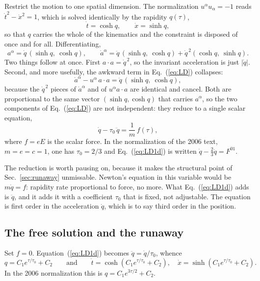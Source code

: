 \documentclass[preprint]{aastex701}
\newcommand{\taunought}{\tau_0}
\begin{document}
Restrict the motion to one spatial dimension. The normalization
$u^\alpha u_\alpha = -1$ reads $\dot t^2 - \dot x^2 = 1$, which is solved
identically by the rapidity $q(\tau)$,
\begin{equation}
\dot t = \cosh q, \qquad \dot x = \sinh q ,
\label{eq:rapidity}
\end{equation}
so that $q$ carries the whole of the kinematics and the constraint is disposed
of once and for all. Differentiating,
\begin{equation}
a^\alpha = \dot q\,(\sinh q,\ \cosh q),
\qquad
\dot a^\alpha = \ddot q\,(\sinh q,\ \cosh q)
             + \dot q^{\,2}(\cosh q,\ \sinh q).
\label{eq:rapidityderivs}
\end{equation}
Two things follow at once. First $a\cdot a = \dot q^{\,2}$, so the invariant
acceleration is just $|\dot q|$. Second, and more usefully, the awkward term in
Eq.~(\ref{eq:LD}) collapses:
\begin{equation}
\dot a^\alpha - u^\alpha\, a\cdot a
= \ddot q\,(\sinh q,\ \cosh q),
\label{eq:reactionreduced}
\end{equation}
because the $\dot q^{\,2}$ pieces of $\dot a^\alpha$ and of
$u^\alpha a\cdot a$ are identical and cancel. Both are proportional to the same
vector $(\sinh q,\cosh q)$ that carries $a^\alpha$, so the two components of
Eq.~(\ref{eq:LD}) are not independent: they reduce to a single scalar equation,
\begin{equation}
\dot q - \taunought\,\ddot q = \frac{1}{m}\,f(\tau),
\label{eq:LD1d}
\end{equation}
where $f = eE$ is the scalar force. In the normalization of the 2006 text,
$m=e=c=1$, one has $\taunought = 2/3$ and Eq.~(\ref{eq:LD1d}) is written
$\dot q - \tfrac23\ddot q = F^{01}$.

The reduction is worth pausing on, because it makes the structural point of
Sec.~\ref{sec:runaway} unmissable. Newton's equation in this variable would be
$m\dot q = f$: rapidity rate proportional to force, no more. What
Eq.~(\ref{eq:LD1d}) adds is $\ddot q$, and it adds it with a coefficient
$\taunought$ that is fixed, not adjustable. The equation is first order in the
acceleration $\dot q$, which is to say third order in the position.

\subsection{The free solution and the runaway}
\label{sec:freesol}

Set $f=0$. Equation~(\ref{eq:LD1d}) becomes
$\ddot q = \dot q/\taunought$, whence
\begin{equation}
q = C_1 e^{\tau/\taunought} + C_2
\qquad\text{and}\qquad
\dot t = \cosh\!\left(C_1e^{\tau/\taunought}+C_2\right),
\quad
\dot x = \sinh\!\left(C_1e^{\tau/\taunought}+C_2\right).
\label{eq:runaway}
\end{equation}
In the 2006 normalization this is $q = C_1e^{3\tau/2}+C_2$.
\end{document}
